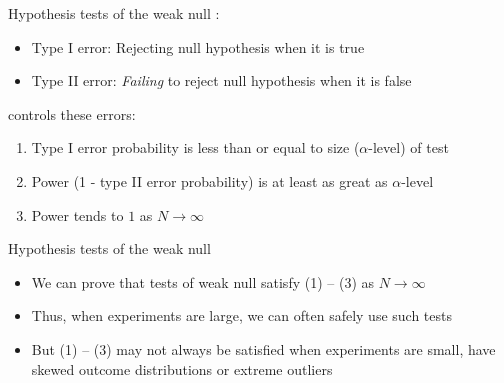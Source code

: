 \documentclass[table, xcolor = {dvipsnames}, 9pt]{beamer}
\theoremstyle{plain}
\newcommand{\bh}[1]{{\color{blue}{#1}}}
\begin{document}
\begin{frame}{Hypothesis tests of the weak null}
\bh{Hypothesis tests susceptible to two errors}:
\begin{itemize}
\item Type I error: Rejecting null hypothesis when it is true
\item Type II error: \textit{Failing} to reject null hypothesis when it is false
\end{itemize} \pause 
\bh{A good test} controls these errors:
\begin{enumerate}
\item Type I error probability is less than or equal to size ($\alpha$-level) of test
\item Power (1 - type II error probability) is at least as great as $\alpha$-level
\item Power tends to $1$ as $N \to \infty$
\end{enumerate}  
\end{frame}
\begin{frame}{Hypothesis tests of the weak null}
\vfill
\begin{itemize} \vfill
\item We can prove that tests of weak null satisfy (1) -- (3) as $N \to \infty$ \vfill 
\item Thus, when experiments are large, we can often safely use such tests \vfill
\item But (1) -- (3) may not always be satisfied when experiments are small, have skewed outcome distributions or extreme outliers \vfill
\end{itemize}
\end{frame}
\end{document}
